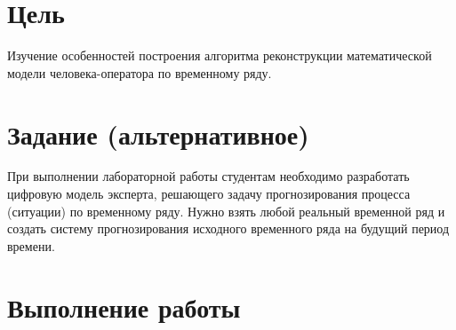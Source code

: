 \documentclass[a4paper, 12pt]{article}
\begin{document}

\pagebreak
\tableofcontents
\newpage
\section*{Цель}
Изучение особенностей построения алгоритма реконструкции математической модели человека-оператора по временному ряду.
\section*{Задание (альтернативное)}
При выполнении лабораторной работы студентам необходимо разработать цифровую модель эксперта, решающего задачу прогнозирования процесса (ситуации) по временному ряду. Нужно взять любой реальный временной ряд и создать систему прогнозирования исходного временного ряда на будущий период времени.
\newpage
\section{Выполнение работы}
\end{document}

